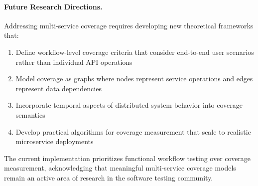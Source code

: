\paragraph{Future Research Directions.}
Addressing multi-service coverage requires developing new theoretical frameworks that:
\begin{enumerate}[leftmargin=*]
    \item Define workflow-level coverage criteria that consider end-to-end user scenarios rather than individual API operations \cite{daniel2023testing}
    \item Model coverage as graphs where nodes represent service operations and edges represent data dependencies
    \item Incorporate temporal aspects of distributed system behavior into coverage semantics
    \item Develop practical algorithms for coverage measurement that scale to realistic microservice deployments
\end{enumerate}

The current implementation prioritizes functional workflow testing over coverage measurement, acknowledging that meaningful multi-service coverage models remain an active area of research in the software testing community.
